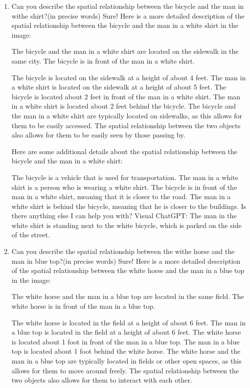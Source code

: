 \begin{enumerate}
    \item Can you describe the spatial relationship between the bicycle and the man in withe shirt?(in precise words)
    \subitem Sure! Here is a more detailed description of the spatial relationship between the bicycle and the man in a white shirt in the image:

    The bicycle and the man in a white shirt are located on the sidewalk in the same city. The bicycle is in front of the man in a white shirt.
    
    The bicycle is located on the sidewalk at a height of about 4 feet.
    The man in a white shirt is located on the sidewalk at a height of about 5 feet.
    The bicycle is located about 2 feet in front of the man in a white shirt.
    The man in a white shirt is located about 2 feet behind the bicycle.
    The bicycle and the man in a white shirt are typically located on sidewalks, as this allows for them to be easily accessed. The spatial relationship between the two objects also allows for them to be easily seen by those passing by.
    
    Here are some additional details about the spatial relationship between the bicycle and the man in a white shirt:
    
    The bicycle is a vehicle that is used for transportation.
    The man in a white shirt is a person who is wearing a white shirt.
    The bicycle is in front of the man in a white shirt, meaning that it is closer to the road.
    The man in a white shirt is behind the bicycle, meaning that he is closer to the buildings.
    Is there anything else I can help you with?
    \subitem Visual ChatGPT: The man in the white shirt is standing next to the white bicycle, which is parked on the side of the street.
    \item Can you describe the spatial relationship between the withe horse and the man in blue top?(in precise words)
    \subitem 
    Sure! Here is a more detailed description of the spatial relationship between the white horse and the man in a blue top in the image:
    
    The white horse and the man in a blue top are located in the same field. The white horse is in front of the man in a blue top.
    
    The white horse is located in the field at a height of about 6 feet.
    The man in a blue top is located in the field at a height of about 6 feet.
    The white horse is located about 1 foot in front of the man in a blue top.
    The man in a blue top is located about 1 foot behind the white horse.
    The white horse and the man in a blue top are typically located in fields or other open spaces, as this allows for them to move around freely. The spatial relationship between the two objects also allows for them to interact with each other.
    

\end{enumerate}
